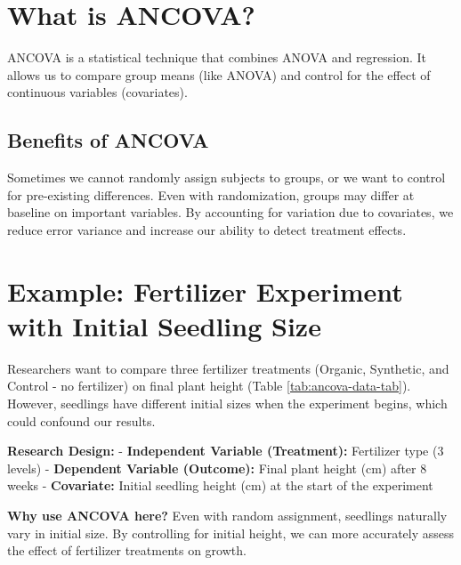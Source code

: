 \documentclass[
]{book}
\begin{document}
\section{What is ANCOVA?}\label{what-is-ancova}

ANCOVA is a statistical technique that combines ANOVA and regression. It allows us to compare group means (like ANOVA) and control for the effect of continuous variables (covariates).

\subsection{Benefits of ANCOVA}\label{benefits-of-ancova}

Sometimes we cannot randomly assign subjects to groups, or we want to control for pre-existing differences. Even with randomization, groups may differ at baseline on important variables. By accounting for variation due to covariates, we reduce error variance and increase our ability to detect treatment effects.

\section{Example: Fertilizer Experiment with Initial Seedling Size}\label{example-fertilizer-experiment-with-initial-seedling-size}

Researchers want to compare three fertilizer treatments (Organic, Synthetic, and Control - no fertilizer) on final plant height (Table \ref{tab:ancova-data-tab}). However, seedlings have different initial sizes when the experiment begins, which could confound our results.

\textbf{Research Design:}
- \textbf{Independent Variable (Treatment):} Fertilizer type (3 levels)
- \textbf{Dependent Variable (Outcome):} Final plant height (cm) after 8 weeks
- \textbf{Covariate:} Initial seedling height (cm) at the start of the experiment

\textbf{Why use ANCOVA here?}
Even with random assignment, seedlings naturally vary in initial size. By controlling for initial height, we can more accurately assess the effect of fertilizer treatments on growth.
\end{document}

